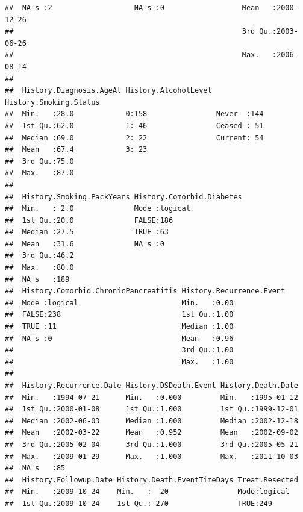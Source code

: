 \documentclass{article}\usepackage[]{graphicx}\usepackage[]{color}
\makeatletter
\newenvironment{kframe}{%
 \def\at@end@of@kframe{}%
 \ifinner\ifhmode%
  \def\at@end@of@kframe{\end{minipage}}%
  \begin{minipage}{\columnwidth}%
 \fi\fi%
 \def\FrameCommand##1{\hskip\@totalleftmargin \hskip-\fboxsep
 \colorbox{shadecolor}{##1}\hskip-\fboxsep
     \hskip-\linewidth \hskip-\@totalleftmargin \hskip\columnwidth}%
 \MakeFramed {\advance\hsize-\width
   \@totalleftmargin\z@ \linewidth\hsize
   \@setminipage}}%
 {\par\unskip\endMakeFramed%
 \at@end@of@kframe}
\newenvironment{knitrout}{}{} %
\makeatother
\begin{document}
\begin{knitrout}
\begin{kframe}
\begin{verbatim}
##  NA's :2                   NA's :0                  Mean   :2000-12-26    
##                                                     3rd Qu.:2003-06-26    
##                                                     Max.   :2006-08-14    
##                                                                           
##  History.Diagnosis.AgeAt History.AlcoholLevel History.Smoking.Status
##  Min.   :28.0            0:158                Never  :144           
##  1st Qu.:62.0            1: 46                Ceased : 51           
##  Median :69.0            2: 22                Current: 54           
##  Mean   :67.4            3: 23                                      
##  3rd Qu.:75.0                                                       
##  Max.   :87.0                                                       
##                                                                     
##  History.Smoking.PackYears History.Comorbid.Diabetes
##  Min.   : 2.0              Mode :logical            
##  1st Qu.:20.0              FALSE:186                
##  Median :27.5              TRUE :63                 
##  Mean   :31.6              NA's :0                  
##  3rd Qu.:46.2                                       
##  Max.   :80.0                                       
##  NA's   :189                                        
##  History.Comorbid.ChronicPancreatitis History.Recurrence.Event
##  Mode :logical                        Min.   :0.00            
##  FALSE:238                            1st Qu.:1.00            
##  TRUE :11                             Median :1.00            
##  NA's :0                              Mean   :0.96            
##                                       3rd Qu.:1.00            
##                                       Max.   :1.00            
##                                                               
##  History.Recurrence.Date History.DSDeath.Event History.Death.Date  
##  Min.   :1994-07-21      Min.   :0.000         Min.   :1995-01-12  
##  1st Qu.:2000-01-08      1st Qu.:1.000         1st Qu.:1999-12-01  
##  Median :2002-06-03      Median :1.000         Median :2002-12-18  
##  Mean   :2002-03-22      Mean   :0.952         Mean   :2002-09-02  
##  3rd Qu.:2005-02-04      3rd Qu.:1.000         3rd Qu.:2005-05-21  
##  Max.   :2009-01-29      Max.   :1.000         Max.   :2011-10-03  
##  NA's   :85                                                        
##  History.Followup.Date History.Death.EventTimeDays Treat.Resected
##  Min.   :2009-10-24    Min.   :  20                Mode:logical  
##  1st Qu.:2009-10-24    1st Qu.: 270                TRUE:249      

\end{verbatim}
\end{kframe}
\end{knitrout}
\end{document}
